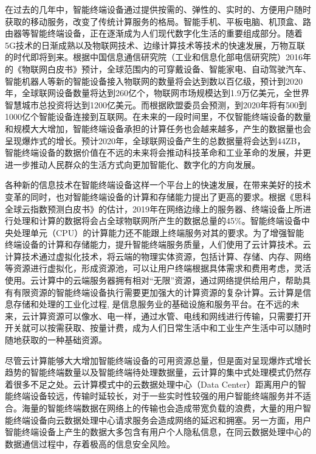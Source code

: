 在过去的几年中，智能终端设备通过提供按需的、弹性的、实时的、方便用户随时获取的移动服务，改变了传统计算服务的格局\citep{施巍松2017边缘计算}。智能手机、平板电脑、机顶盒、路由器等智能终端设备，正在逐渐成为人们现代数字化生活的重要组成部分。随着5G技术的日渐成熟以及物联网技术、边缘计算技术等技术的快速发展，万物互联的时代即将到来\cite{taleb2017mobile}。根据中国信息通信研究院（工业和信息化部电信研究院）2016年的《物联网白皮书》预计，全球范围内的可穿戴设备、智能家电、自动驾驶汽车、智能机器人等新的智能设备接入物联网的数量将会达到数以百亿级，预计到2020年，全球联网设备数量将达到260亿个，物联网市场规模达到1.9万亿美元，全世界智慧城市总投资将达到1200亿美元\citep{物联网白皮书2016}。而根据欧盟委员会预测，到2020年将有500到1000亿个智能设备连接到互联网\cite{sundmaeker2010vision}。在未来的一段时间里，不仅智能终端设备的数量和规模大大增加，智能终端设备承担的计算任务也会越来越多，产生的数据量也会呈现爆炸式的增长。预计2020年，全球联网设备产生的总数据量将会达到44ZB\citep{物联网白皮书2016}，智能终端设备的数据价值在不远的未来将会推动科技革命和工业革命的发展，并更进一步推动人民群众的生活方式向更加智能化、数字化的方向发展。

各种新的信息技术在智能终端设备这样一个平台上的快速发展，在带来美好的技术变革的同时，也对智能终端设备的计算和存储能力提出了更高的要求。根据《思科全球云指数预测白皮书》的估计，2019年在网络边缘上的服务器、终端设备上所进行处理和计算的数据将会占全球物联网所产生的数据总量的45\%\citep{Cisco2016}。智能终端设备中央处理单元（CPU）的计算能力还不能跟上终端服务对其的要求\cite{dinh2013survey,othman2014survey,wang2015survey}。为了增强智能终端设备的计算和存储能力，提升智能终端服务质量，人们使用了云计算技术。云计算技术通过虚拟化技术，将云端的物理实体资源，包括计算、存储、内存、网络等资源进行虚拟化，形成资源池，可以让用户终端根据具体需求和费用考虑，灵活使用。云计算中的云端服务器拥有相对“无限”资源，通过网络提供给用户，帮助具有有限资源的智能终端设备执行需要更加强大的计算资源的复杂计算\citep{Noor.2018}。云计算是信息存储和处理的工业化过程, 是信息服务业的基础设施和服务平台\citep{江绵恒2010}。在不远的未来，云计算资源可以像水、电一样，通过水管、电线和网线进行传输，只需要打开开关就可以按需获取、按量计费，成为人们日常生活中和工业生产生活中可以随时随地获取的一种基础资源\citep{buyya2009cloud}。

尽管云计算能够大大增加智能终端设备的可用资源总量，但是面对呈现爆炸式增长趋势的智能终端数量以及智能终端待处理数据量，云计算的集中式处理模式仍然存着很多不足之处。云计算模式中的云数据处理中心（Data Center）距离用户的智能终端设备较远，传输时延较长，对于一些实时性较强的用户智能终端服务并不适合。海量的智能终端数据在网络上的传输也会造成带宽负载的浪费，大量的用户智能终端设备向云数据处理中心请求服务会造成网络的延迟和拥塞\citep{Ismail2016Evaluation}。另一方面，用户智能终端设备上产生的数据大多包含有用户个人隐私信息，在同云数据处理中心的数据通信过程中，存着极高的信息安全风险。

